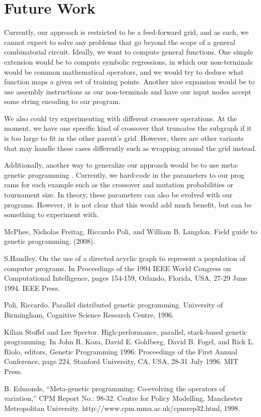 \documentclass{article}
\begin{document}
	\section{Future Work}
	
	Currently, our approach is restricted to be a feed-forward grid, and as such, we cannot expect to solve any problems that go beyond the scope of a general combinatorial circuit. Ideally, we want to compute general functions. One simple extension would be to compute symbolic regressions, in which our non-terminals would be common mathematical operators, and we would try to deduce what function maps a given set of training points. Another nice expansion would be to use assembly instructions as our non-terminals and have our input nodes accept some string encoding to our program.
	
	We also could try experimenting with different crossover operations. At the moment, we have one specific kind of crossover that truncates the subgraph if it is too large to fit in the other parent's grid. However, there are other variants that may handle these cases differently such as wrapping around the grid instead.
	
	Additionally, another way to generalize our approach would be to use meta-genetic programming \cite{b5}. Currently, we hard-code in the parameters to our prog
	rams for each example such as the crossover and mutation probabilities or tournament size. In theory, these parameters can also be evolved with our programs. However, it is not clear that this would add much benefit, but can be something to experiment with.
	
	\begin{thebibliography}{00}
				
		 McPhee, Nicholas Freitag, Riccardo Poli, and William B. Langdon. Field
		guide to genetic programming. (2008).
		
		 S.Handley. On the use of a directed acyclic graph to represent a population of computer programs. In Proceedings of the 1994 IEEE World Congress on Computational Intelligence, pages 154-159, Orlando, Florida, USA, 27-29 June 1994. IEEE Press.

		 Poli, Riccardo. Parallel distributed genetic programming. University of Birmingham, Cognitive Science Research Centre, 1996.

		 Kilian Stoffel and Lee Spector. High-performance, parallel, stack-based genetic programming. In John R. Koza, David E. Goldberg, David B. Fogel, and Rick L. Riolo, editors, Genetic Programming 1996: Proceedings of the First Annual Conference, page 224, Stanford University, CA, USA, 28-31 July 1996. MIT Press.
			
		 B. Edmonds, “Meta-genetic programming: Co-evolving the operators of variation,” CPM Report No.: 98-32. Centre for Policy Modelling, Manchester Metropolitan University. http://www.cpm.mmu.ac.uk/cpmrep32.html, 1998.
		\end{thebibliography}
	
\end{document}
